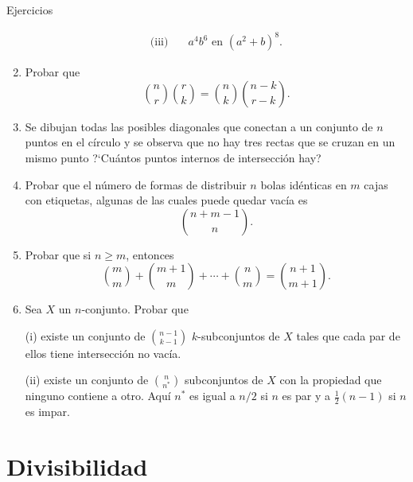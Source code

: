 \documentclass[11pt,spanish,makeidx]{amsbook}
\theoremstyle{definition}
\theoremstyle{remark}
\begin{document}
\begin{section}{Ejercicios}
\begin{enumerate}
$$\begin{aligned}
\text{(iii)}\quad & a^4 b^6 \text{ en } (a^2+b)^8.
\end{aligned}
$$
\item Probar que
$$
\binom{n}{r}\binom{r}{k}=\binom{n}{k}\binom{n-k}{r-k}.
$$
\item Se dibujan todas las posibles diagonales que conectan a un conjunto de $n$ puntos en el círculo y se observa que no hay tres rectas que se cruzan en un mismo punto ?`Cuántos puntos internos de intersección hay?
\item Probar que el número de formas de distribuir $n$ bolas idénticas en $m$ cajas con etiquetas, algunas de las cuales puede quedar vacía es
$$
\binom{n+m-1}{n}.
$$
\item Probar que si $n \ge m$, entonces
$$
\binom{m}{m}+\binom{m+1}{m}+\cdots+\binom{n}{m}=\binom{n+1}{m+1}.
$$
\item  Sea $X$ un $n$-conjunto. Probar que

(i) existe un conjunto de $\binom{n-1}{k-1}$ $k$-subconjuntos de $X$ tales que cada par de ellos tiene intersección no vacía.

(ii) existe un conjunto de $\binom{n}{n^*}$ subconjuntos de $X$ con la propiedad que ninguno contiene a otro. Aquí $n^*$ es igual a $n/2$ si $n$ es par y a $\frac12(n-1)$ si $n$ es impar.
\end{enumerate}

\end{section}

\chapter[Divisibilidad]{Divisibilidad}
\end{document}
